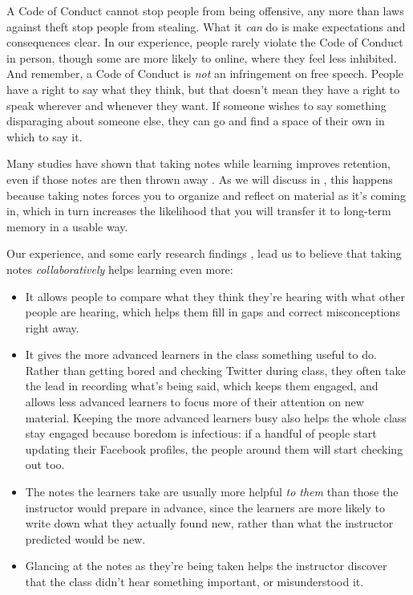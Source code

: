 A Code of Conduct cannot stop people from being offensive, any more
than laws against theft stop people from stealing. What it \emph{can}
do is make expectations and consequences clear.  In our experience,
people rarely violate the Code of Conduct in person, though some are
more likely to online, where they feel less inhibited.  And remember,
a Code of Conduct is \emph{not} an infringement on free speech.
People have a right to say what they think, but that doesn't mean they
have a right to speak wherever and whenever they want.  If someone
wishes to say something disparaging about someone else, they can go
and find a space of their own in which to say it.


Many studies have shown that taking notes while learning improves
retention, even if those notes are then thrown away \cite{fixme}.  As
we will discuss in , this happens because taking
notes forces you to organize and reflect on material as it's coming
in, which in turn increases the likelihood that you will transfer it
to long-term memory in a usable way.

Our experience, and some early research findings \cite{fixme}, lead us
to believe that taking notes \emph{collaboratively} helps learning
even more:

\begin{itemize}

\item
  It allows people to compare what they think they're hearing with
  what other people are hearing, which helps them fill in gaps and
  correct misconceptions right away.

\item
  It gives the more advanced learners in the class something useful to
  do.  Rather than getting bored and checking Twitter during class,
  they often take the lead in recording what's being said, which keeps
  them engaged, and allows less advanced learners to focus more of
  their attention on new material.  Keeping the more advanced learners
  busy also helps the whole class stay engaged because boredom is
  infectious: if a handful of people start updating their Facebook
  profiles, the people around them will start checking out too.

\item
  The notes the learners take are usually more helpful \emph{to them}
  than those the instructor would prepare in advance, since the learners
  are more likely to write down what they actually found new, rather than
  what the instructor predicted would be new.

\item
  Glancing at the notes as they're being taken helps the instructor
  discover that the class didn't hear something important, or
  misunderstood it.

\end{itemize}

